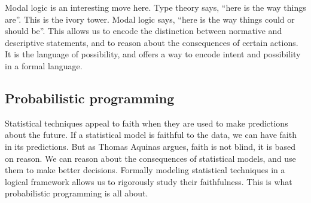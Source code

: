 \documentclass[sigplan,nonacm]{acmart}\settopmatter{printfolios=false,printccs=false,printacmref=false}
\begin{document}
  Modal logic is an interesting move here. Type theory says, ``here is the way things are''. This is the ivory tower. Modal logic says, ``here is the way things could or should be''. This allows us to encode the distinction between normative and descriptive statements, and to reason about the consequences of certain actions. It is the language of possibility, and offers a way to encode intent and possibility in a formal language.

  \subsection{Probabilistic programming}

  Statistical techniques appeal to faith when they are used to make predictions about the future. If a statistical model is faithful to the data, we can have faith in its predictions. But as Thomas Aquinas argues, faith is not blind, it is based on reason. We can reason about the consequences of statistical models, and use them to make better decisions. Formally modeling statistical techniques in a logical framework allows us to rigorously study their faithfulness. This is what probabilistic programming is all about.

  
\end{document}
